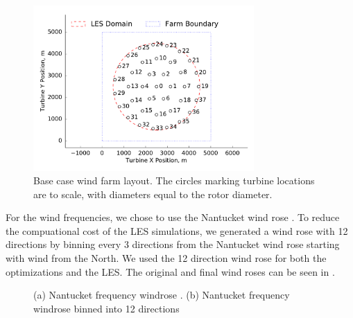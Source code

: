 \documentclass[conf]{new-aiaa}
\begin{document}
\begin{figure}[ht]
	\centering
	\includegraphics[width=0.75\textwidth]{final_images/round_farm_38Turbines_5DSpacing_start.pdf}
	\caption{Base case wind farm layout. The circles marking turbine locations are to scale, with diameters equal to the rotor diameter.}
	\label{fig:starting-layout}
\end{figure}

For the wind frequencies, we chose to use the Nantucket wind rose \cite{wrcc2017} %
. To reduce the compuational cost of the LES simulations, we generated a wind rose with 12 directions by binning every 3 directions from the Nantucket wind rose starting with wind from the North. We used the 12 direction wind rose for both the optimizations and the LES. The original and final wind roses can be seen in .

\begin{figure}[ht]
	\centering
	\caption{(a) Nantucket frequency windrose \cite{wrcc2017}. (b) Nantucket frequency windrose binned into 12 directions}
	\label{fig:windrose}
\end{figure}
\end{document}
